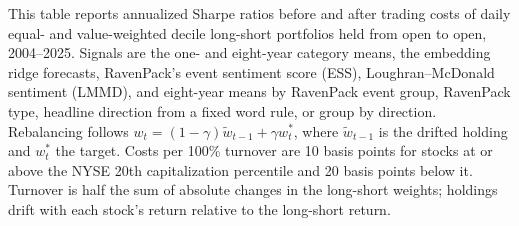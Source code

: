 \begin{table}[htbp]
\centering
\caption{Portfolio Sharpe Ratios before and after Trading Costs}
\label{tab:tabA_costs}
\begin{minipage}{\linewidth}\footnotesize
This table reports annualized Sharpe ratios before and after trading costs of daily equal- and value-weighted decile long-short portfolios held from open to open, 2004--2025. Signals are the one- and eight-year category means, the embedding ridge forecasts, RavenPack's event sentiment score (ESS), Loughran--McDonald sentiment (LMMD), and eight-year means by RavenPack event group, RavenPack type, headline direction from a fixed word rule, or group by direction. Rebalancing follows $w_t=(1-\gamma)\tilde w_{t-1}+\gamma w_t^*$, where $\tilde w_{t-1}$ is the drifted holding and $w_t^*$ the target. Costs per 100\% turnover are 10 basis points for stocks at or above the NYSE 20th capitalization percentile and 20 basis points below it. Turnover is half the sum of absolute changes in the long-short weights; holdings drift with each stock's return relative to the long-short return.
\end{minipage}
\medskip


\end{table}
